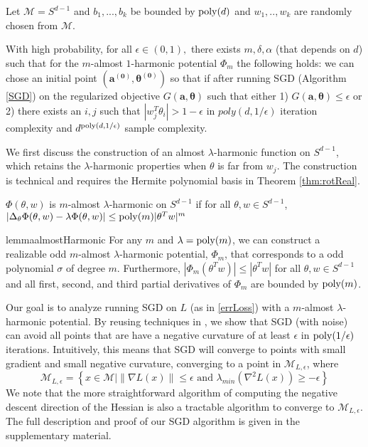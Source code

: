\begin{theorem}\label{eigSGD}
  Let $\mathcal{M} = S^{d-1}$ and $b_1,...,b_k$ be bounded by $\mathrm{poly}(d)$ and $w_1,..,w_k$ are randomly chosen from $\mathcal{M}$.  

  With high probability, for all $\epsilon \in (0,1),$ there exists $m, \delta, \alpha$ (that depends on $d$) such that for the $m$-almost $1$-harmonic potential $\Phi_m$ the
  following holds: we can chose an initial point $(\boldsymbol{a^{(0)}, \theta^{(0)}})$ so that if after running SGD (Algorithm \ref{SGD}) on the regularized objective
  $G(\boldsymbol{a,\theta})$ such that either 1) $G(\boldsymbol{a,\theta}) \leq \epsilon$ or 2) there exists an $i, j$ such that $|w_j^T\theta_i| > 1- \epsilon$ in $poly(d,1/\epsilon)$ iteration complexity and $d^{\mathrm{poly}(d, 1/\epsilon)}$ sample complexity.
\end{theorem}
%
%
We first discuss the construction of an almost $\lambda$-harmonic function on $S^{d-1}$, which retains the $\lambda$-harmonic properties when $\theta$ is far from $w_j$. The construction is technical and requires the Hermite polynomial basis in Theorem \ref{thm:rotReal}.
%
%
\begin{definition}
$\Phi(\theta, w)$ is $m$-almost $\lambda$-harmonic on $S^{d-1}$ if for
all $\theta, w\in S^{d-1}$, $|\Delta_{\theta}\Phi(\theta, w) - \lambda \Phi (\theta,w)| \leq \mathrm{poly}(m)|\theta^Tw|^m$ 
\end{definition}
%
%
\begin{restatable}{lemma}{almostHarmonic}\label{AlmostHarmonic}
For any $m$ and $\lambda = \mathrm{poly}(m)$,  we can construct a realizable odd $m$-almost $\lambda$-harmonic potential, $\Phi_m$, that corresponds to a odd polynomial $\sigma$ of degree $m$. Furthermore, $|\Phi_m(\theta^Tw)|\leq |\theta^Tw|$ for all $\theta, w \in S^{d-1}$ and all first, second, and third partial derivatives of $\Phi_m$ are bounded by $\mathrm{poly}(m)$.
\end{restatable} 
%
%
%
Our goal is to analyze running SGD on $L$ (as in \eqref{errLoss}) with a $m$-almost $\lambda$-harmonic potential. By reusing techniques in \cite{GeHJY15}, we show that SGD (with noise) can avoid all points that are have a negative curvature of at least $\epsilon$ in $\mathrm{poly}(1/\epsilon)$ iterations. Intuitively, this means that SGD will converge to points with small gradient and small negative curvature, converging to a point in $\mathcal{M}_{L, \epsilon}$, where 
%
\[\mathcal{M}_{L, \epsilon} = \left\{x\in \mathcal{M} \Big| \|\nabla L(x)\|
  \leq \epsilon \text{ and } \lambda_{min}(\nabla^2 L(x)) \geq
  -\epsilon\right\}\]
%
We note that the more straightforward algorithm of computing the negative descent direction of the Hessian is also a tractable algorithm to converge to $\mathcal{M}_{L,\epsilon}$. The full description and proof of our SGD algorithm is given in the supplementary material. 

